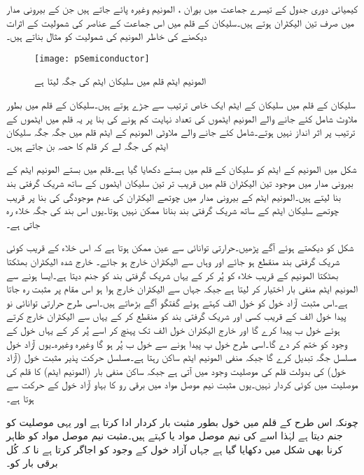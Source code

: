 کیمیائی دوری جدول کے تیسرے جماعت میں بوران ، المونیم   وغیرہ پائے جاتے ہیں جن کے بیرونی مدار میں صرف تین الیکٹران ہوتے ہیں۔سلیکان کے قلم میں اس جماعت کے عناصر کی شمولیت کے اثرات دیکھنے کی خاطر المونیم کی شمولیت کو مثال بناتے ہیں۔
\begin{figure}
\centering
\texttt{[image: pSemiconductor]}
\caption{ المونیم ایٹم قلم میں سلیکان ایٹم کی جگہ لیتا ہے}
\label{شکل_مثبت_نیم_موصل}
\end{figure}
سلیکان کے قلم میں سلیکان کے ایٹم ایک خاص ترتیب سے جڑے ہوتے ہیں۔سلیکان کے قلم میں بطور ملاوٹ شامل کئے جانے والے المونیم ایٹموں کی تعداد نہایت کم ہونے کی بنا پر یہ قلم میں ایٹموں کے ترتیب پر اثر انداز نہیں ہوتے۔شامل کئے جانے والے ملاوٹی المونیم کے ایٹم قلم میں جگہ جگہ سلیکان ایٹم کی جگہ لے کر  قلم  کا حصہ بن جاتے ہیں۔

شکل   میں المونیم کے ایٹم کو سلیکان کے قلم میں بستے دکھایا گیا ہے۔قلم میں بستے المونیم ایٹم کے بیرونی مدار میں موجود تین الیکٹران قلم میں قریب تر تین سلیکان ایٹموں کے ساتھ شریک گرفتی بند بنا لیتے ہیں۔المونیم ایٹم کے بیرونی مدار میں چوتھے الیکٹران کی عدم موجودگی کی بنا پر قریب چوتھے سلیکان ایٹم کے ساتھ شریک گرفتی بند بنانا ممکن نہیں ہوتا۔یوں اس بند کی جگہ خلاء رہ جاتی ہے۔

شکل   کو دیکھتے ہوئے آگے پڑھیں۔حرارتی توانائی سے عین ممکن ہوتا ہے کہ اس خلاء کے قریب کوئی شریک گرفتی بند منقطع ہو جائے اور وہاں سے الیکٹران خارج ہو جائے۔ خارج شدہ الیکٹران بھٹکتا بھٹکتا المونیم کے قریب خلاء کو پُر کر کے  یہاں شریک گرفتی بند کو جنم دیتا ہے۔ایسا ہونے سے المونیم ایٹم منفی بار اختیار کر لیتا ہے جبکہ جہاں سے الیکٹران خارج ہوا ہو اس مقام پر مثبت   رہ جاتا ہے۔اس مثبت آزاد خول کو خول  الف کہتے ہوئے گفتگو آگے بڑھاتے ہیں۔اسی طرح حرارتی توانائی نو پیدا خول  الف کے قریب کسی اور شریک گرفتی بند کو منقطع کر کے یہاں سے الیکٹران خارج کرتے ہوئے خول  ب پیدا کرے گا اور خارج الیکٹران خول  الف تک پہنچ کر اسے پُر کر کے یہاں خول کے وجود کو ختم کر دے گا۔اسی طرح خول  پ پیدا ہونے سے خول  ب پُر ہو گا وغیرہ وغیرہ۔یوں آزاد خول مسلسل جگہ تبدیل کرے گا جبکہ منفی المونیم ایٹم ساکن رہتا ہے۔مسلسل حرکت پذیر مثبت خول  (آزاد خول) کی بدولت قلم کی موصلیت وجود میں آتی ہے جبکہ ساکن منفی بار (المونیم ایٹم) کا قلم کی موصلیت میں کوئی کردار نہیں۔یوں مثبت نیم موصل مواد میں برقی رو کا بہاو آزاد خول کے حرکت سے ہوتا ہے۔ 

چونکہ اس طرح کے قلم میں خول 	بطور مثبت بار کردار ادا کرتا ہے اور یہی موصلیت کو جنم دیتا ہے لہٰذا اسے  کی نیم موصل مواد یا   کہتے ہیں۔مثبت نیم موصل مواد کو ظاہر کرنا بھی شکل   میں دکھایا گیا ہے جہاں  آزاد خول کے وجود کو اجاگر کرتا ہے نا کہ کُل برقی بار کو۔

